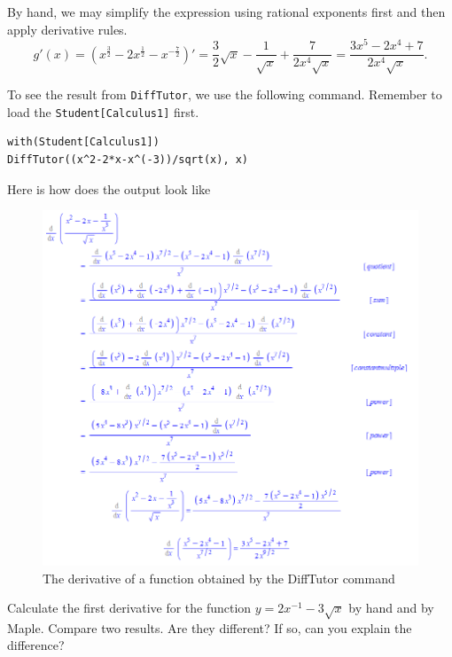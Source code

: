 \documentclass[]{book}
\theoremstyle{definition}
\theoremstyle{definition}
\theoremstyle{definition}
\theoremstyle{remark}
\let\BeginKnitrBlock\begin \let\EndKnitrBlock\end
\begin{document}
\BeginKnitrBlock{solution}
{}
By hand, we may simplify the expression using rational exponents first and then apply derivative rules.
\[
g'(x)=(x^{\frac32}-2x^{\frac12}-x^{-\frac72})'=\frac32\sqrt{x}-\frac{1}{\sqrt{x}}+\frac{7}{2x^4\sqrt{x}}=\frac{3x^5-2x^4+7}{2x^4\sqrt{x}}.
\]

To see the result from \texttt{DiffTutor}, we use the following command. Remember to load the \texttt{Student{[}Calculus1{]}} first.

\begin{verbatim}
with(Student[Calculus1])
DiffTutor((x^2-2*x-x^(-3))/sqrt(x), x)
\end{verbatim}

Here is how does the output look like

\begin{figure}
\centering
\includegraphics{figs/DiffTutor-Example.png}
\caption{The derivative of a function obtained by the DiffTutor command}
\end{figure}
\EndKnitrBlock{solution}

\BeginKnitrBlock{exercise}
\protect\hypertarget{exr:unnamed-chunk-10}{}{\label{exr:unnamed-chunk-10} }
Calculate the first derivative for the function \(y=2x^{-1}-3\sqrt{x}\) by hand and by Maple. Compare two results. Are they different? If so, can you explain the difference?
\EndKnitrBlock{exercise}
\end{document}
